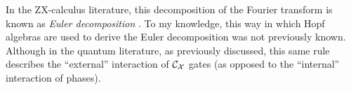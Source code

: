 \begin{theorem}
%
%
%
%
\end{theorem}
In the ZX-calculus literature, this decomposition of the Fourier transform is known as {\it Euler decomposition} \cite{duncan2009graph}.  To my knowledge, this way in which Hopf algebras are used to derive the Euler decomposition was not previously known.  Although in the quantum literature, as previously discussed, this same rule describes the ``external'' interaction of ${\cal C}_{\cal X}$ gates (as opposed to the ``internal'' interaction of phases).




